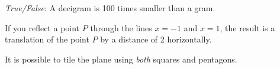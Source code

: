 \documentclass[11pt,letterpaper]{article}
\begin{document}
\quizsol \textit{True/False}: A decigram is 100 times smaller than a gram. 




If you reflect a point $P$ through the lines $x= -1$ and $x= 1$, the result is a translation of the point $P$ by a distance of 2 horizontally. 



It is possible to tile the plane using \textit{both} squares and pentagons. 


\end{document}
